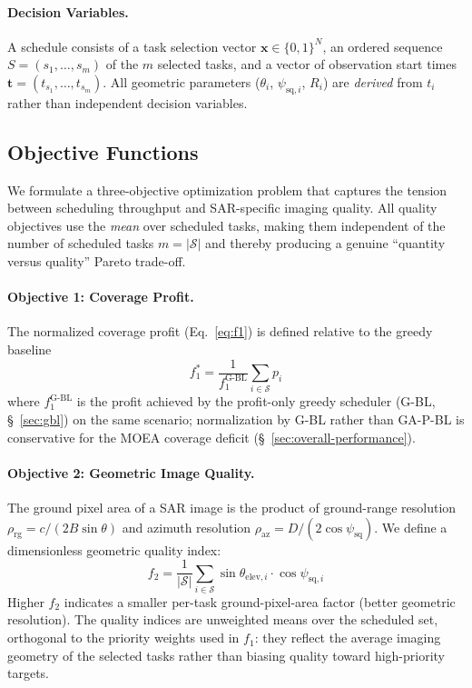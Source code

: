 \documentclass[preprint,12pt,authoryear]{elsarticle}
\begin{document}
\paragraph{Decision Variables.}
A schedule consists of a task selection vector $\mathbf{x} \in \{0,1\}^N$,
an ordered sequence $S = (s_1,\ldots,s_m)$ of the $m$ selected tasks, and
a vector of observation start times $\mathbf{t} = (t_{s_1},\ldots,t_{s_m})$.
All geometric parameters ($\theta_i$, $\psi_{\text{sq},i}$, $R_i$) are
\emph{derived} from $t_i$ rather than independent decision variables.
\subsection{Objective Functions}\label{sec:objective-functions}
We formulate a three-objective optimization problem that captures the
tension between scheduling throughput and SAR-specific imaging quality.
All quality objectives use the \emph{mean} over scheduled tasks, making
them independent of the number of scheduled tasks $m = |\mathcal{S}|$
and thereby producing a genuine ``quantity versus quality'' Pareto trade-off.
\paragraph{Objective 1: Coverage Profit.}
The normalized coverage profit (Eq.~\ref{eq:f1}) is defined relative to the greedy baseline
\begin{equation}
f_1^* = \frac{1}{f_1^{\text{G-BL}}} \sum_{i \in \mathcal{S}} p_i
\label{eq:f1}
\end{equation}
where $f_1^{\text{G-BL}}$ is the profit achieved by the profit-only greedy
scheduler (G-BL, \S~\ref{sec:gbl}) on the same scenario; normalization by
G-BL rather than GA-P-BL is conservative for the MOEA coverage deficit
(\S~\ref{sec:overall-performance}).
\paragraph{Objective 2: Geometric Image Quality.}
The ground pixel area of a SAR image is the product of ground-range resolution
$\rho_{\text{rg}} = c / (2B \sin\theta)$ and azimuth resolution
$\rho_{\text{az}} = D / (2 \cos\psi_{\text{sq}})$.
We define a dimensionless geometric quality index:
\begin{equation}
f_2 = \frac{1}{|\mathcal{S}|} \sum_{i \in \mathcal{S}} \sin\theta_{\text{elev},i} \cdot \cos\psi_{\text{sq},i}
\label{eq:f2}
\end{equation}
Higher $f_2$ indicates a smaller per-task ground-pixel-area factor (better geometric resolution).
The quality indices are unweighted means over the scheduled set, orthogonal to
the priority weights used in $f_1$: they reflect the average imaging geometry
of the selected tasks rather than biasing quality toward high-priority targets.
\end{document}

